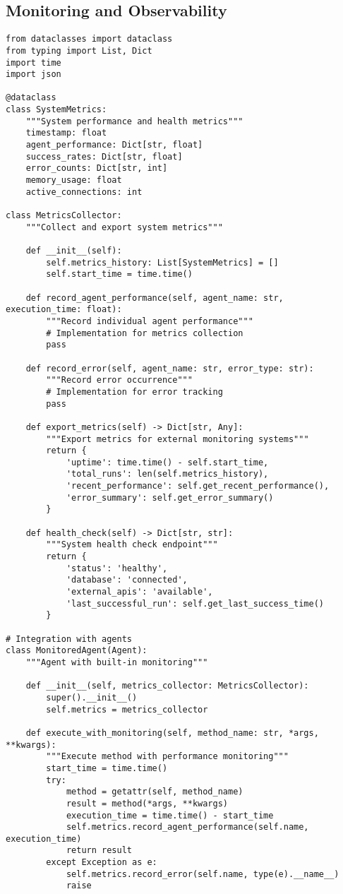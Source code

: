 \subsection{Monitoring and Observability}

\begin{lstlisting}[caption=Monitoring and Metrics System]
from dataclasses import dataclass
from typing import List, Dict
import time
import json

@dataclass
class SystemMetrics:
    """System performance and health metrics"""
    timestamp: float
    agent_performance: Dict[str, float]
    success_rates: Dict[str, float]
    error_counts: Dict[str, int]
    memory_usage: float
    active_connections: int

class MetricsCollector:
    """Collect and export system metrics"""
    
    def __init__(self):
        self.metrics_history: List[SystemMetrics] = []
        self.start_time = time.time()
    
    def record_agent_performance(self, agent_name: str, execution_time: float):
        """Record individual agent performance"""
        # Implementation for metrics collection
        pass
    
    def record_error(self, agent_name: str, error_type: str):
        """Record error occurrence"""
        # Implementation for error tracking
        pass
    
    def export_metrics(self) -> Dict[str, Any]:
        """Export metrics for external monitoring systems"""
        return {
            'uptime': time.time() - self.start_time,
            'total_runs': len(self.metrics_history),
            'recent_performance': self.get_recent_performance(),
            'error_summary': self.get_error_summary()
        }
    
    def health_check(self) -> Dict[str, str]:
        """System health check endpoint"""
        return {
            'status': 'healthy',
            'database': 'connected',
            'external_apis': 'available',
            'last_successful_run': self.get_last_success_time()
        }

# Integration with agents
class MonitoredAgent(Agent):
    """Agent with built-in monitoring"""
    
    def __init__(self, metrics_collector: MetricsCollector):
        super().__init__()
        self.metrics = metrics_collector
    
    def execute_with_monitoring(self, method_name: str, *args, **kwargs):
        """Execute method with performance monitoring"""
        start_time = time.time()
        try:
            method = getattr(self, method_name)
            result = method(*args, **kwargs)
            execution_time = time.time() - start_time
            self.metrics.record_agent_performance(self.name, execution_time)
            return result
        except Exception as e:
            self.metrics.record_error(self.name, type(e).__name__)
            raise
\end{lstlisting}


